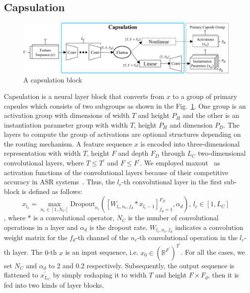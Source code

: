 \documentclass[review]{elsarticle}
\begin{document}
\subsection{Capsulation}
\begin{figure}[hbt!]
  \centering
  \includegraphics[trim={0 0cm 0 0cm}, clip, width=1.0\linewidth]{02_capsulation.jpg}
  \caption{A capsulation block}
  \label{fig:capsulation}
\end{figure}
Capsulation is a neural layer block that converts from $x$ to a group of primary capsules which consists of two subgroups as shown in the Fig.~\ref{fig:capsulation}.
One group is an activation group with dimensions of width $T$ and height $P_H$ and 
the other is an instantiation parameter group with width $T$, height $P_H$ and dimension $P_D$. 
The layers to compute the group of activations are optional structures depending on the routing mechanism.
A feature sequence $x$ is encoded into three-dimensional representation with width $T$, height $F$ and depth $F_D$ through $L_C$ two-dimensional convolutional layers, where $T \leq T^\prime$ and $F \leq F^\prime$.
We employed maxout~\citep{DBLP:journals/corr/abs-1302-4389} as activation functions of the convolutional layers because of their competitive accuracy in ASR systems~\citep{DBLP:conf/interspeech/ZhangPBZLBC16}.
Thus, the $l_c$-th convolutional layer in the first sub-block is defined as follows:
\begin{equation}
x_{l_c}=\max_{n_c \in [1, N_C]} \text{Dropout}_{n_c}([W_{l_c, n_c, f_d}*x_{l_c-1}]_{f_d=1}^{F_D}, \alpha_d)\text{, }l_c \in [1, L_C]
\label{eq:maxout}
\end{equation}
, where $*$ is a convolutional operator, $N_C$ is the number of convolutional operations in a layer and $\alpha_d$ is the dropout rate. $W_{l_c, n_c, f_d}$ indicates a convolution weight matrix for the $f_d$-th channel of the $n_c$-th convolutional operation in the $l_c$-th layer.
The $0$-th $x$ is an input sequence, i.e. $x_0 \in (\mathbb{R}^{F^\prime})^{T^\prime}$.
For all the cases, we set $N_C$ and $\alpha_d$ to 2 and 0.2 respectively.
Subsequently, the output sequence is flattened to $x^\prime_{L_C}$ by simply reshaping it to width $T$ and height $F \times F_d$, then it is fed into two kinds of layer blocks.
\end{document}
